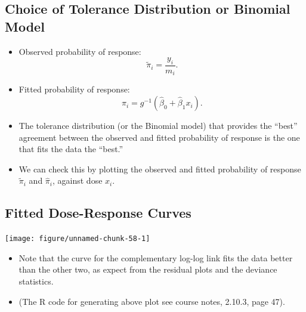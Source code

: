 \documentclass{article}\usepackage[]{graphicx}\usepackage[svgnames]{xcolor}
\newenvironment{knitrout}{}{} %
\begin{document}
\subsection*{Choice of Tolerance Distribution or Binomial Model}
\begin{itemize}
      \item Observed probability of response:
            \[ \tilde{\pi}_i=\frac{y_i}{m_i}. \]
      \item Fitted probability of response:
            \[ \hat{\pi}_i=g^{-1}(\hat{\beta}_0+\hat{\beta}_1x_i). \]
      \item The tolerance distribution (or the Binomial model) that provides the ``best''
            agreement between the observed and fitted probability of response is the one that fits the data the ``best.''
      \item We can check this by plotting the observed and fitted probability of response $ \tilde{\pi}_i $ and $ \hat{\pi}_i $,
            against dose $ x_i $.
\end{itemize}
\subsection*{Fitted Dose-Response Curves}
\begin{knitrout}
\color{fgcolor}

{\centering \texttt{[image: figure/unnamed-chunk-58-1]} 

}


\end{knitrout}
\begin{itemize}
      \item Note that the curve for the complementary log-log link fits the data better than
            the other two, as expect from the residual plots and the deviance statistics.
      \item (The R code for generating above plot see course notes, 2.10.3, page 47).
\end{itemize}
\end{document}
